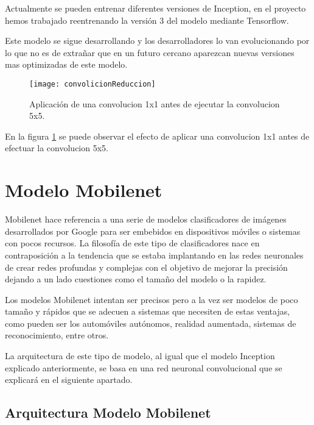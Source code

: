 Actualmente se pueden entrenar diferentes versiones de Inception, en el proyecto hemos trabajado reentrenando la versión 3 del modelo mediante Tensorflow.

Este modelo se sigue desarrollando y los desarrolladores lo van evolucionando por lo que no es de extrañar que en un futuro cercano aparezcan nuevas versiones mas optimizadas de este modelo.

\begin{figure}[h]
    \begin{center}%
        \begin{center}%
          \texttt{[image: convolicionReduccion]}%
          \caption{Aplicación de una convolucion 1x1 antes de ejecutar la convolucion 5x5.}%
          \label{figconvolicionReduccion}%
        \end{center}%
  	\end{center}%
\end{figure}%

En la figura \ref{figconvolicionReduccion} se puede observar el efecto de aplicar una convolucion 1x1 antes de efectuar la convolucion 5x5.

\section{Modelo Mobilenet}

Mobilenet hace referencia a una serie de modelos clasificadores de imágenes desarrollados por Google para ser embebidos en dispositivos móviles o sistemas con pocos recursos. La filosofía de este tipo de clasificadores nace en contraposición a la tendencia que se estaba implantando en las redes neuronales de crear redes profundas y complejas con el objetivo de mejorar la precisión dejando a un lado cuestiones como el tamaño del modelo o la rapidez.\cite{mobilenet}

Los modelos Mobilenet intentan ser precisos pero a la vez ser modelos de poco tamaño y rápidos que se adecuen a sistemas que necesiten de estas ventajas, como pueden ser los automóviles autónomos, realidad aumentada, sistemas de reconocimiento, entre otros.

La arquitectura de este tipo de modelo, al igual que el modelo Inception explicado anteriormente, se basa en una red neuronal convolucional que se explicará en el siguiente apartado.

\subsection{Arquitectura Modelo Mobilenet}

